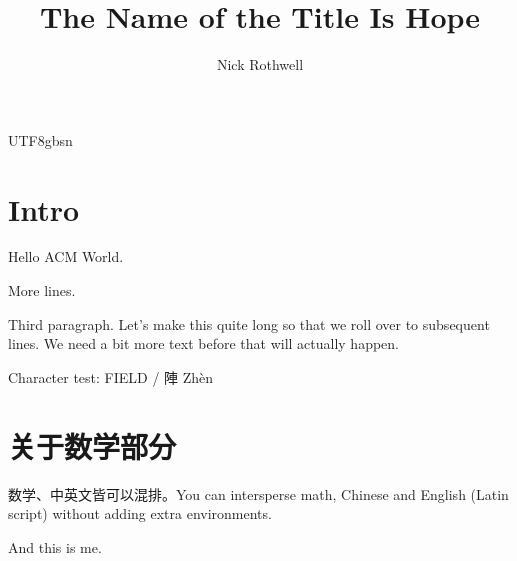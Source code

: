 \documentclass[manuscript,review,anonymous,natbib=false]{acmart}
\title{The Name of the Title Is Hope}
\author{Nick Rothwell}
\begin{document}
\begin{CJK*}{UTF8}{gbsn}

\maketitle

\section{Intro}

Hello ACM World.

More lines.

Third paragraph. Let's make this quite long so that we roll over to subsequent lines. We need a bit more text before that will actually happen.

Character test: FIELD / 陣 Zh\`{e}n

\section{关于数学部分}
数学、中英文皆可以混排。You can intersperse math, Chinese and English (Latin script) without adding extra environments.

And this is me\cite{rothwell_audiomulch_nodate}.

\end{CJK*}

\printbibliography
\end{document}
